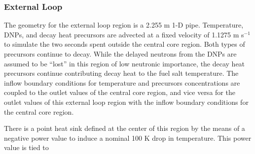 \subsubsection{External Loop}

The geometry for the external loop region is a 2.255 m 1-D pipe. Temperature,
\glspl{DNP}, and decay heat precursors are advected at a fixed velocity of
1.1275 m s$^{-1}$ to simulate the two seconds spent outside the central core
region. Both types of precursors continue to decay. While the delayed neutrons
from the \glspl{DNP} are assumed to be ``lost'' in this region of low
neutronic importance, the decay heat precursors continue contributing decay
heat to the fuel salt temperature. The inflow boundary conditions for
temperature and precursors concentrations are coupled to the outlet values of
the central core region, and vice versa for the outlet values of this
external loop region with the inflow boundary conditions for the central core
region.

There is a point heat sink defined at the center of this region by the means
of a negative power value to induce a nominal 100 K drop in temperature. This
power value is tied to 
